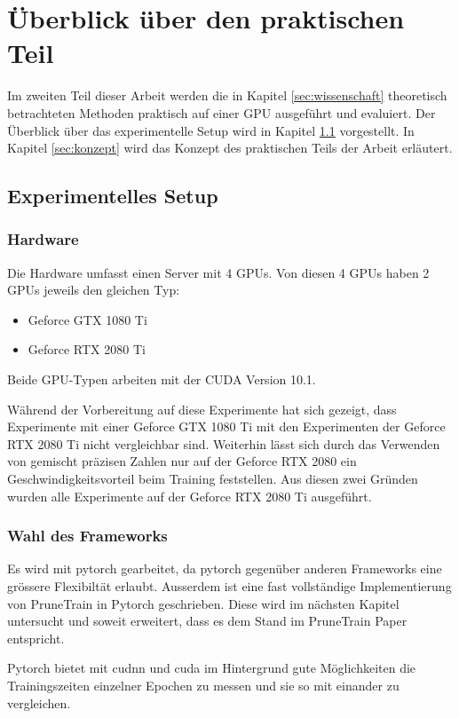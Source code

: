 \chapter{Überblick über den praktischen Teil}\label{sec:experimente}
Im zweiten Teil dieser Arbeit werden die in Kapitel \ref{sec:wissenschaft} theoretisch betrachteten Methoden praktisch auf einer GPU ausgeführt und evaluiert. Der Überblick über das experimentelle Setup wird in Kapitel \ref{sec:setup} vorgestellt. In Kapitel \ref{sec:konzept} wird das Konzept des praktischen Teils der Arbeit erläutert.

\section{Experimentelles Setup}\label{sec:setup}
\subsection{Hardware}
Die Hardware umfasst einen Server mit 4 GPUs.
Von diesen 4 GPUs haben 2 GPUs jeweils den gleichen Typ:
\begin{itemize}
 \item Geforce GTX 1080 Ti
 \item Geforce RTX 2080 Ti 
\end{itemize}

Beide GPU-Typen arbeiten mit der CUDA Version 10.1. 

Während der Vorbereitung auf diese Experimente hat sich gezeigt, dass Experimente mit einer Geforce GTX 1080 Ti mit den Experimenten der Geforce RTX 2080 Ti nicht vergleichbar sind. Weiterhin lässt sich durch das Verwenden von gemischt präzisen Zahlen nur auf der Geforce RTX 2080 ein Geschwindigkeitsvorteil beim Training feststellen. Aus diesen zwei Gründen wurden alle Experimente auf der Geforce RTX 2080 Ti ausgeführt.  


\subsection{Wahl des Frameworks}

Es wird mit pytorch gearbeitet, da pytorch gegenüber anderen Frameworks eine grössere Flexibiltät erlaubt. Ausserdem ist eine fast vollständige Implementierung von PruneTrain in Pytorch geschrieben. Diese wird im nächsten Kapitel untersucht und soweit erweitert, dass es dem Stand im PruneTrain Paper entspricht.

Pytorch bietet mit cudnn und cuda im Hintergrund gute Möglichkeiten die Trainingszeiten einzelner Epochen zu messen und sie so mit einander zu vergleichen.


